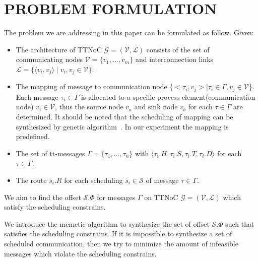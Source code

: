 \documentclass[journal]{IEEEtran}
\newcommand{\calG}{\mathcal{G}}
\newcommand{\calV}{\mathcal{V}}
\newcommand{\calL}{\mathcal{L}}
\newcommand{\calS}{\mathcal{S}}
\begin{document}
\section{PROBLEM FORMULATION\label{s:formulation}}
The problem we are addressing in this paper can be formulated as follow. Given:
\begin{itemize}
	\item The architecture of TTNoC $\calG=(\calV,\calL)$ consists of the set of communicating nodes $\mathcal{V}=\{\mathit{v}_{1},\dots,\mathit{v}_{m}\}$ and interconnection links $\mathcal{L}=\{ \langle v_i,v_j  \rangle \mid  v_i,v_j \in \calV\}$.
	\item The mapping of message to communication node
		$\{<\tau_{i},v_{j}>\mid \tau_{i}\in\Gamma,v_{j}\in\mathcal{V}$\}. 
		Each message $\tau_{i}\in\Gamma$ is allocated to a specific process element(communication node) $v_{i}\in\mathcal{V}$, 
		thus the source node $v_{a}$ and sink node $v_{b}$ for each $\tau \in\Gamma$ are determined.
		It should be noted that the scheduling of mapping can be synthesized by genetic algorithm~\cite{DBLP:conf/recosoc/MesidisI11}.
		In our experiment the mapping is predefined.
	\item The set of tt-messages $ \Gamma = \{\tau_{1},\dots,\tau_{n} \}$ with 
	$\langle \tau_{i}.H,\tau_{i}.S, \tau_{i}.T,	\tau_{i}.D\rangle$ for each $\tau \in \Gamma$.
	\item The route $s_i.R$ for each scheduling $s_i \in \calS$ of message $\tau \in \Gamma$.
\end{itemize}
We aim to find the offset $\calS.\Phi$ for messages $\Gamma$ on TTNoC $\calG=(\calV,\calL)$ which satisfy the scheduling constrains. 

We introduce the memetic algorithm to synthesize the set of offset $\calS.\Phi$ such that satisfies the scheduling constrains. 
If it is impossible to synthesize a set of scheduled communication, 
then we try to minimize the amount of infeasible messages which violate the scheduling constrains.
\end{document}
